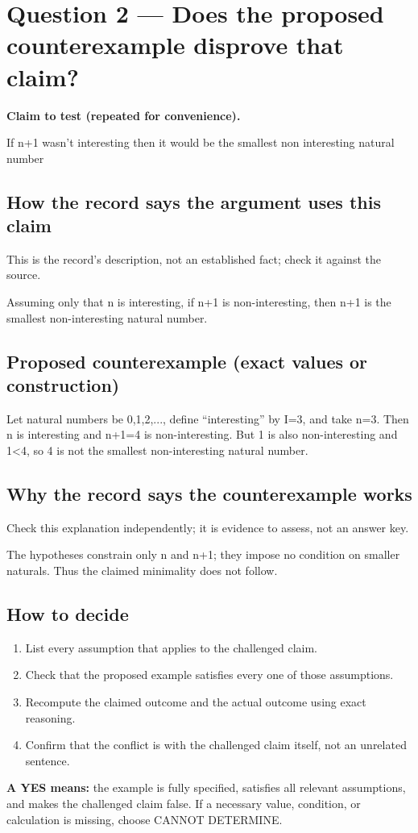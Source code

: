 \documentclass[11pt]{article}
\begin{document}
\section*{Question 2 --- Does the proposed counterexample disprove that claim?}
\textbf{Claim to test (repeated for convenience).}
\begin{Vsrc}
If n+1 wasn’t interesting then it would be the smallest non interesting natural number
\end{Vsrc}
\subsection*{How the record says the argument uses this claim}
This is the record's description, not an established fact; check it against the source.
\begin{Vsrc}
Assuming only that n is interesting, if n+1 is non-interesting, then n+1 is the smallest non-interesting natural number.
\end{Vsrc}
\subsection*{Proposed counterexample (exact values or construction)}
\begin{Vsrc}
Let natural numbers be {0,1,2,...}, define “interesting” by I={3}, and take n=3. Then n is interesting and n+1=4 is non-interesting. But 1 is also non-interesting and 1<4, so 4 is not the smallest non-interesting natural number.
\end{Vsrc}
\subsection*{Why the record says the counterexample works}
Check this explanation independently; it is evidence to assess, not an answer key.
\begin{Vsrc}
The hypotheses constrain only n and n+1; they impose no condition on smaller naturals. Thus the claimed minimality does not follow.
\end{Vsrc}
\subsection*{How to decide}
\begin{enumerate}
\item List every assumption that applies to the challenged claim.
\item Check that the proposed example satisfies every one of those assumptions.
\item Recompute the claimed outcome and the actual outcome using exact reasoning.
\item Confirm that the conflict is with the challenged claim itself, not an unrelated sentence.
\end{enumerate}
\textbf{A YES means:} the example is fully specified, satisfies all relevant assumptions, and makes the challenged claim false. If a necessary value, condition, or calculation is missing, choose CANNOT DETERMINE.
\end{document}
